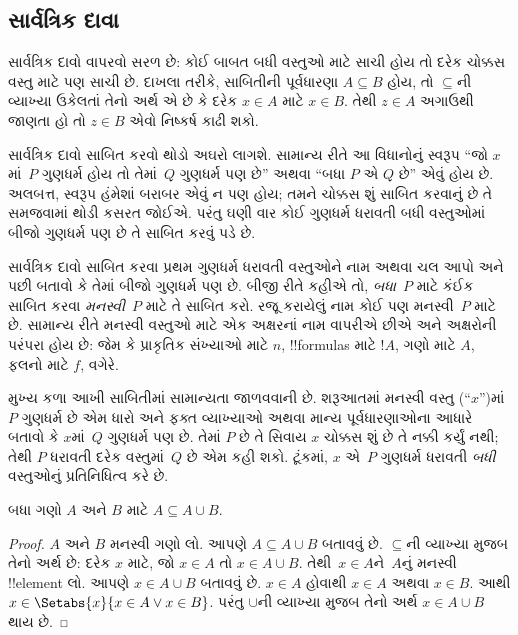 \documentclass[../../../include/open-logic-section]{subfiles}
\begin{document}
\subsection{સાર્વત્રિક દાવા}

સાર્વત્રિક દાવો વાપરવો સરળ છે: કોઈ બાબત બધી વસ્તુઓ માટે
સાચી હોય તો દરેક ચોક્કસ વસ્તુ માટે પણ સાચી છે. દાખલા તરીકે,
સાબિતીની પૂર્વધારણા $A \subseteq B$ હોય, તો $\subseteq$ની
વ્યાખ્યા ઉકેલતાં તેનો અર્થ એ છે કે દરેક $x \in A$ માટે
$x \in B$. તેથી $z \in A$ અગાઉથી જાણતા હો તો
$z \in B$ એવો નિષ્કર્ષ કાઢી શકો.

સાર્વત્રિક દાવો સાબિત કરવો થોડો અઘરો લાગશે. સામાન્ય રીતે આ
વિધાનોનું સ્વરૂપ ``જો $x$માં~$P$ ગુણધર્મ હોય તો તેમાં~$Q$
ગુણધર્મ પણ છે'' અથવા ``બધા $P$ એ $Q$ છે'' એવું હોય છે.
અલબત્ત, સ્વરૂપ હંમેશાં બરાબર એવું ન પણ હોય; તમને ચોક્કસ
શું સાબિત કરવાનું છે તે સમજવામાં થોડી કસરત જોઈએ. પરંતુ ઘણી
વાર કોઈ ગુણધર્મ ધરાવતી બધી વસ્તુઓમાં બીજો ગુણધર્મ પણ છે તે
સાબિત કરવું પડે છે.

સાર્વત્રિક દાવો સાબિત કરવા પ્રથમ ગુણધર્મ ધરાવતી વસ્તુઓને નામ
અથવા ચલ આપો અને પછી બતાવો કે તેમાં બીજો ગુણધર્મ પણ છે.
બીજી રીતે કહીએ તો, \emph{બધા}~$P$ માટે કંઈક સાબિત કરવા
\emph{મનસ્વી}~$P$ માટે તે સાબિત કરો. રજૂ કરાયેલું નામ કોઈ
પણ મનસ્વી~$P$ માટે છે. સામાન્ય રીતે મનસ્વી વસ્તુઓ માટે
એક અક્ષરનાં નામ વાપરીએ છીએ અને અક્ષરોની પરંપરા હોય છે:
જેમ કે પ્રાકૃતિક સંખ્યાઓ માટે $n$, !!{formula}s માટે $!A$,
ગણો માટે $A$, ફલનો માટે $f$, વગેરે.

મુખ્ય કળા આખી સાબિતીમાં સામાન્યતા જાળવવાની છે. શરૂઆતમાં મનસ્વી
વસ્તુ (``$x$'')માં~$P$ ગુણધર્મ છે એમ ધારો અને ફક્ત વ્યાખ્યાઓ
અથવા માન્ય પૂર્વધારણાઓના આધારે બતાવો કે $x$માં~$Q$ ગુણધર્મ
પણ છે. તેમાં $P$ છે તે સિવાય $x$ ચોક્કસ શું છે તે નક્કી
કર્યું નથી; તેથી $P$ ધરાવતી દરેક વસ્તુમાં~$Q$ છે એમ કહી
શકો. ટૂંકમાં, $x$ એ~$P$ ગુણધર્મ ધરાવતી \emph{બધી} વસ્તુઓનું
પ્રતિનિધિત્વ કરે છે.

\begin{prop}
  બધા ગણો $A$ અને $B$ માટે $A \subseteq A \cup B$.
\end{prop}

\begin{proof}
  $A$ અને $B$ મનસ્વી ગણો લો. આપણે $A
  \subseteq A \cup B$ બતાવવું છે. $\subseteq$ની વ્યાખ્યા મુજબ
  તેનો અર્થ છે: દરેક $x$ માટે, જો $x \in A$ તો $x \in A \cup B$.
  તેથી~$x \in A$ને~$A$નું મનસ્વી !!{element} લો. આપણે $x \in A
  \cup B$ બતાવવું છે. $x \in A$ હોવાથી $x \in A$ અથવા $x \in B$.
  આથી $x \in \Setabs{x}{x \in A \lor x \in B}$. પરંતુ $\cup
  $ની વ્યાખ્યા મુજબ તેનો અર્થ $x \in A \cup B$ થાય છે.
\end{proof}
\end{document}
